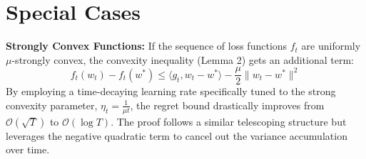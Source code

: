 \documentclass[11pt]{article}
\begin{document}
\section*{Special Cases}
\textbf{Strongly Convex Functions:}
If the sequence of loss functions $f_t$ are uniformly $\mu$-strongly convex, the convexity inequality (Lemma 2) gets an additional term:
$$f_t(w_t) - f_t(w^*) \le \langle g_t, w_t - w^* \rangle - \frac{\mu}{2}\|w_t - w^*\|^2$$
By employing a time-decaying learning rate specifically tuned to the strong convexity parameter, $\eta_t = \frac{1}{\mu t}$, the regret bound drastically improves from $\mathcal{O}(\sqrt{T})$ to $\mathcal{O}(\log T)$. The proof follows a similar telescoping structure but leverages the negative quadratic term to cancel out the variance accumulation over time.
\end{document}

